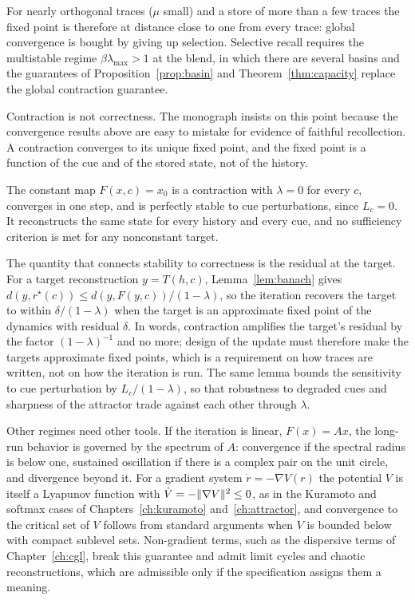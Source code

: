 For nearly orthogonal traces ($\mu$ small) and a store of more than a few traces the fixed point is therefore at distance close to one from every trace: global convergence is bought by giving up selection. Selective recall requires the multistable regime $\beta\lambda_{\max}>1$ at the blend, in which there are several basins and the guarantees of Proposition~\ref{prop:basin} and Theorem~\ref{thm:capacity} replace the global contraction guarantee.

Contraction is not correctness. The monograph insists on this point because the convergence results above are easy to mistake for evidence of faithful recollection. A contraction converges to its unique fixed point, and the fixed point is a function of the cue and of the stored state, not of the history.

\begin{example}\label{ex:constant}
The constant map $F(x,c)=x_0$ is a contraction with $\lambda=0$ for every $c$, converges in one step, and is perfectly stable to cue perturbations, since $L_c=0$. It reconstructs the same state for every history and every cue, and no sufficiency criterion is met for any nonconstant target.
\end{example}

The quantity that connects stability to correctness is the residual at the target. For a target reconstruction $y=T(h,c)$, Lemma~\ref{lem:banach} gives $d(y,r^\star(c))\le d(y,F(y,c))/(1-\lambda)$, so the iteration recovers the target to within $\delta/(1-\lambda)$ when the target is an approximate fixed point of the dynamics with residual $\delta$. In words, contraction amplifies the target's residual by the factor $(1-\lambda)^{-1}$ and no more; design of the update must therefore make the targets approximate fixed points, which is a requirement on how traces are written, not on how the iteration is run. The same lemma bounds the sensitivity to cue perturbation by $L_c/(1-\lambda)$, so that robustness to degraded cues and sharpness of the attractor trade against each other through $\lambda$.

Other regimes need other tools. If the iteration is linear, $F(x)=Ax$, the long-run behavior is governed by the spectrum of $A$: convergence if the spectral radius is below one, sustained oscillation if there is a complex pair on the unit circle, and divergence beyond it. For a gradient system $\dot r=-\nabla V(r)$ the potential $V$ is itself a Lyapunov function with $\dot V=-\lVert \nabla V\rVert^2\le0$, as in the Kuramoto and softmax cases of Chapters~\ref{ch:kuramoto} and~\ref{ch:attractor}, and convergence to the critical set of $V$ follows from standard arguments when $V$ is bounded below with compact sublevel sets. Non-gradient terms, such as the dispersive terms of Chapter~\ref{ch:cgl}, break this guarantee and admit limit cycles and chaotic reconstructions, which are admissible only if the specification assigns them a meaning.


